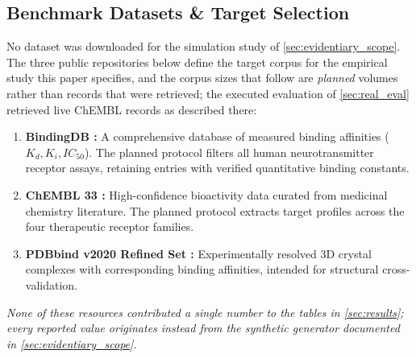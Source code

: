 \documentclass{article}
\theoremstyle{definition}
\begin{document}
\subsection{Benchmark Datasets \& Target Selection}
No dataset was downloaded for the simulation study of \cref{sec:evidentiary_scope}. The three public repositories below define the target corpus for the empirical study this paper specifies, and the corpus sizes that follow are \emph{planned} volumes rather than records that were retrieved; the executed evaluation of \cref{sec:real_eval} retrieved live ChEMBL records as described there:
\begin{enumerate}[leftmargin=1.5em,noitemsep]
    \item \textbf{BindingDB \citep{gilson2016bindingdb}:} A comprehensive database of measured binding affinities ($K_d, K_i, IC_{50}$). The planned protocol filters all human neurotransmitter receptor assays, retaining entries with verified quantitative binding constants.
    \item \textbf{ChEMBL 33 \citep{mendez2019chembl}:} High-confidence bioactivity data curated from medicinal chemistry literature. The planned protocol extracts target profiles across the four therapeutic receptor families.
    \item \textbf{PDBbind v2020 Refined Set \citep{wang2004pdbbind,liu2015pdbbind}:} Experimentally resolved 3D crystal complexes with corresponding binding affinities, intended for structural cross-validation.
\end{enumerate}
\emph{None of these resources contributed a single number to the tables in \cref{sec:results}; every reported value originates instead from the synthetic generator documented in \cref{sec:evidentiary_scope}.}
\end{document}
